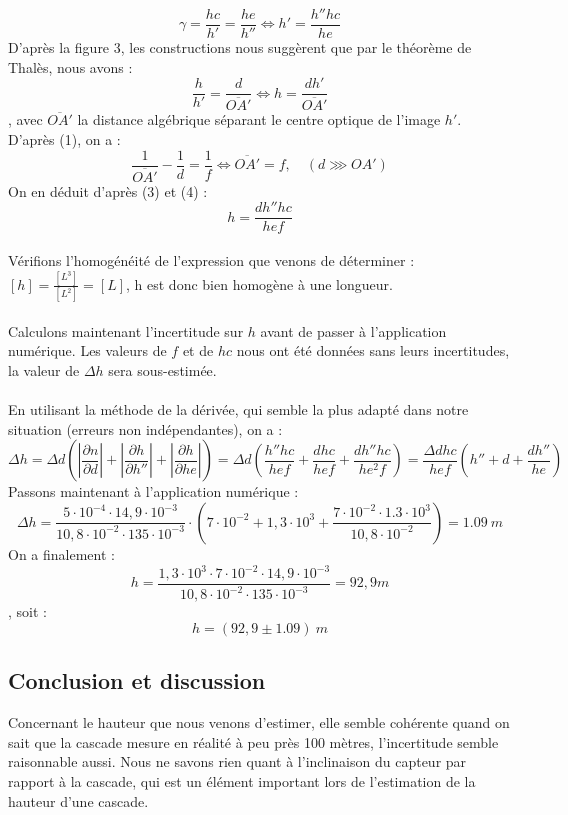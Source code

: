 \documentclass[12pt,a4paper]{article}
\begin{document}
\begin{equation}
\gamma=\frac{hc}{h'} = \frac{he}{h''} \Longleftrightarrow h' = \frac{h''hc}{he}
\end{equation}
D'après la figure 3, les constructions nous suggèrent que par le théorème de Thalès, nous avons : 
\begin{equation}
\frac{h}{h'}=\frac{d}{\overline{OA'}} \Longleftrightarrow h = \frac{dh'}{\overline{OA'}}
\end{equation}
, avec $\overline{OA'}$ la distance algébrique séparant le centre optique de l'image $h'$. D'après (1), on a :\\ $$\frac{1}{\overline{OA'}}-\frac{1}{d} = \frac{1}{f} \Longleftrightarrow \overline{OA'} = f, \quad (d\ggg OA')$$
On en déduit d'après (3) et (4) : 
\begin{equation}
\boxed{h = \frac{dh''hc}{hef}}
\end{equation}
\\
Vérifions l'homogénéité de l'expression que venons de déterminer : $[h] = \frac{[L^3]}{[L^2]} = [L]$, h est donc bien homogène à une longueur.\\
\\Calculons maintenant l'incertitude sur $h$ avant de passer à l'application numérique. Les valeurs de $f$ et de $hc$ nous ont été données sans leurs incertitudes, la valeur de $\Delta h$ sera sous-estimée.\\ \\ En utilisant la méthode de la dérivée, qui semble la plus adapté dans notre situation (erreurs non indépendantes), on a : $$ \Delta h = \Delta d\left(\left\lvert \frac{\partial n}{\partial d} \right\rvert + \left\lvert \frac{\partial h}{\partial h''} \right\rvert + \left\lvert \frac{\partial h}{\partial he} \right\rvert\right)= \Delta d\left(\frac{h''hc}{hef}+\frac{dhc}{hef} + \frac{dh''hc}{he^2f}\right) = \frac{\Delta dhc}{hef}\left( h''+d + \frac{dh''}{he}\right) $$ 
Passons maintenant à l'application numérique : \\
$$\Delta h = \frac{5\cdot 10^{-4}\cdot 14,9\cdot 10^{-3}}{10,8\cdot 10^{-2}\cdot 135\cdot 10^{-3}}\cdot \left( 7\cdot 10^{-2} + 1,3\cdot 10^{3}+\frac{7\cdot 10^{-2}\cdot 1.3\cdot 10^{3}}{10,8\cdot 10^{-2}}\right) = 1.09~m $$
On a finalement : $$h = \frac{1,3\cdot 10^{3}\cdot 7\cdot 10^{-2}\cdot 14,9\cdot 10^{-3}}{10,8\cdot 10^{-2}\cdot 135\cdot 10^{-3}} = 92,9  m$$, soit :$$\boxed{h = (92,9 \pm 1.09)~m }$$
\subsection{Conclusion et discussion}
Concernant le hauteur que nous venons d'estimer, elle semble cohérente quand on sait que la cascade mesure en réalité à peu près 100 mètres, l'incertitude semble raisonnable aussi. Nous ne savons rien quant à l'inclinaison du capteur par rapport à la cascade, qui est un élément important lors de l'estimation de la hauteur d'une cascade.\\
\end{document}
